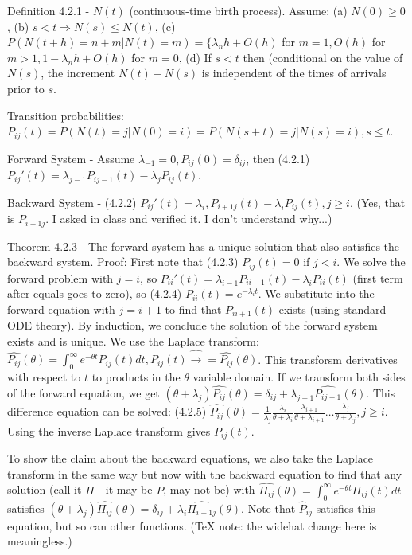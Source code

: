 \documentclass{article}
\begin{document}
Definition 4.2.1 - $N(t)$ (continuous-time birth process). Assume: (a) $N(0) \ge 0$, (b) $s < t \Rightarrow N(s) \le N(t)$, (c) $P(N(t+h) = n+m | N(t) = m) = \{ \lambda_n h + O(h)$ for $m = 1, O(h)$ for $m > 1, 1 - \lambda_n h + O(h)$ for $m = 0$, (d) If $s < t$ then (conditional on the value of $N(s)$, the increment $N(t) - N(s)$ is independent of the times of arrivals prior to $s$.

Transition probabilities: $P_{ij}(t) = P(N(t) = j|N(0)=i) = P(N(s+t) = j|N(s)=i), s \le t$.

Forward System - Assume $\lambda_{-1} = 0, P_{ij}(0) = \delta_{ij}$, then (4.2.1) $P_{ij}'(t) = \lambda_{j-1}P_{ij-1}(t) - \lambda_j P_{ij}(t)$.

Backward System - (4.2.2) $P_{ij}'(t) = \lambda_i, P_{i+1j}(t) - \lambda_i P_{ij}(t), j \ge i$. (Yes, that is $P_{i+1j}$. I asked in class and verified it. I don't understand why...)

Theorem 4.2.3 - The forward system has a unique solution that also satisfies the backward system. Proof: First note that (4.2.3) $P_{ij}(t) = 0$ if $j < i$. We solve the forward problem with $j=i$, so $P_{ii}'(t) = \lambda_{i-1}P_{ii-1}(t) - \lambda_i P_{ii}(t)$ (first term after equals goes to zero), so (4.2.4) $P_{ii}(t) = e^{-\lambda_it}$. We substitute into the forward equation with $j=i+1$ to find that $P_{ii+1}(t)$ exists (using standard ODE theory). By induction, we conclude the solution of the forward system exists and is unique. We use the Laplace transform: $\widehat{P_{ij}}(\theta) = \int_0^\infty e^{-\theta t} P_{ij}(t)dt, P_{ij}(t) \widehat{\rightarrow} = \widehat{P_{ij}}(\theta)$. This transforsm derivatives with respect to $t$ to products in the $\theta$ variable domain. If we transform both sides of the forward equation, we get $(\theta + \lambda_j) \widehat{P_{ij}}(\theta) = \delta_{ij} + \lambda_{j-1} \widehat{P_{ij-1}}(\theta)$. This difference equation can be solved: (4.2.5) $\widehat{P_{ij}}(\theta) = \frac{1}{\lambda_j} \frac{\lambda_i}{\theta + \lambda_i} \frac{\lambda_{i+1}}{\theta + \lambda_{i+1}} \dots \frac{\lambda_j}{\theta + \lambda_j}, j \ge i$. Using the inverse Laplace transform gives $P_{ij}(t)$.

To show the claim about the backward equations, we also take the Laplace transform in the same way but now with the backward equation to find that any solution (call it $\Pi$---it may be $P$, may not be) with $\widehat{\Pi_{ij}}(\theta) = \int_0^\infty e^{-\theta t} \Pi_{ij}(t) dt$ satisfies $(\theta + \lambda_j) \widehat{\Pi_{ij}}(\theta) = \delta_{ij} + \lambda_i \widehat{\Pi_{i+1j}}(\theta)$. Note that $\widehat{P}_{ij}$ satisfies this equation, but so can other functions. (TeX note: the widehat change here is meaningless.)
\end{document}
